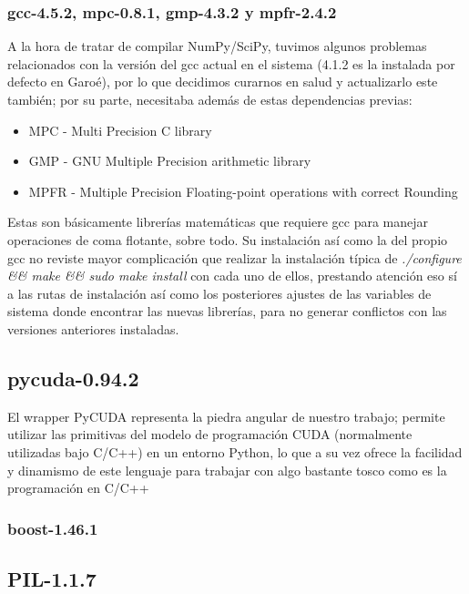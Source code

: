 \documentclass[twoside]{article}
\begin{document}
\subsubsection{gcc-4.5.2, mpc-0.8.1, gmp-4.3.2 y mpfr-2.4.2}

A la hora de tratar de compilar NumPy/SciPy, tuvimos algunos problemas relacionados con la versión del gcc actual en el sistema (4.1.2 es la instalada por defecto en Garoé), por lo que decidimos curarnos en salud y actualizarlo este también; por su parte, necesitaba además de estas dependencias previas:

\begin{itemize}
   \item MPC - Multi Precision C library
   \item GMP - GNU Multiple Precision arithmetic library
   \item MPFR - Multiple Precision Floating-point operations with correct Rounding
\end{itemize}

Estas son básicamente librerías matemáticas que requiere gcc para manejar operaciones de coma flotante, sobre todo. Su instalación así como la del propio gcc no reviste mayor complicación que realizar la instalación típica de \emph{./configure \&\& make \&\& sudo make install} con cada uno de ellos, prestando atención eso sí a las rutas de instalación así como los posteriores ajustes de las variables de sistema donde encontrar las nuevas librerías, para no generar conflictos con las versiones anteriores instaladas.

\subsection{pycuda-0.94.2}

El wrapper PyCUDA representa la piedra angular de nuestro trabajo; permite utilizar las primitivas del modelo de programación CUDA (normalmente utilizadas bajo C/C++) en un entorno Python, lo que a su vez ofrece la facilidad y dinamismo de este lenguaje para trabajar con algo bastante tosco como es la programación en C/C++

\subsubsection{boost-1.46.1}

\subsection{PIL-1.1.7}
\end{document}
